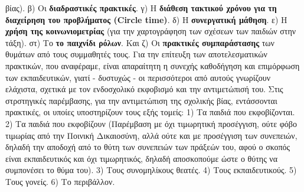 \documentclass[12pt,a4paper]{book}
\begin{document}
βίας). β) Οι \textbf{διαδραστικές πρακτικές}. γ) Η \textbf{διάθεση τακτικού
χρόνου για τη διαχείρηση του προβλήματος (Circle time)}. δ) Η
\textbf{συνεργατική μάθηση}. ε) Η \textbf{χρήση της κοινωνιομετρίας} (για την
χαρτογράφηση των σχέσεων των παιδιών στην τάξη). στ) Το \textbf{το παιχνίδι
ρόλων}. Και ζ) Οι \textbf{πρακτικές συμπαράστασης} των θυμάτων από τους
συμμαθητές τους.
\newline\setlength{\parindent}{20pt}\indent  Για την επίτευξη των
αποτελεσματικών πρακτικών, που αναφέραμε, είναι απαραίτητη η συνεχής καθοδήγηση
και επιμόρφωση των εκπαιδευτικών, γιατί - δυστυχώς - οι περισσότεροι από αυτούς
γνωρίζουν ελάχιστα, σχετικά με τον ενδοσχολικό εκφοβισμό και την αντιμετώπισή
του.
\newline\setlength{\parindent}{20pt}\indent Στις στρστηγικές παρέμβασης, για την
αντιμετώπιση της σχολικής βίας, εντάσσονται πρακτικές, οι υποίες υποστηρίζουν
τους εξής τομείς: 1) Τα παιδιά που εκφοβίζονται. 2) Τα παιδιά που εκφοβίζουν
(Παρέμβαση με όχι τιμωρητική προσέγγιση, ούτε φόβο τιμωρίας από την Ποινική
Δικαιοσύνη, αλλά ούτε και με προσέγγιση των συνεπειών, δηλαδή την αποδοχή από
το θύτη των συνεπειών των πράξεών του, αφού ο σκοπός είναι εκπαιδευτικός και
όχι τιμωρητικός, δηλαδή αποσκοπούμε ώστε ο θύτης να συμπονέσει το θύμα του).
3) Τους συνομηλίκους θεατές. 4) Τους εκπαιδευτικούς. 5) Τους γονείς. 6) Το
περιβάλλον. 
\end{document}

